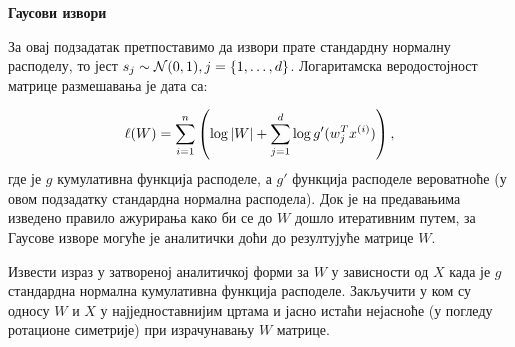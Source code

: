 \item {} \textbf{Гаусови извори}

За овај подзадатак претпоставимо да извори прате стандардну нормалну расподелу, то јест $s_j \sim \mathcal{N}(0,1), j=\{1,\ldots,{d}\}$. Логаритамска веродостојност матрице размешавања је дата са:

$$\ell(W) = \sum_{i=1}^{n}\left(\log|W| + \sum_{j=1}^{d} \log g'(w_j^Tx^{(i)})\right),$$ где је $g$ кумулативна функција расподеле, а $g'$ функција расподеле вероватноће (у овом подзадатку стандардна нормална расподела). Док је на предавањима изведено правило ажурирања како би се до $W$ дошло итеративним путем, за Гаусове изворе могуће је аналитички доћи до резултујуће матрице $W$.

Извести израз у затвореној аналитичкој форми за $W$ у зависности од $X$ када је $g$ стандардна нормална кумулативна функција расподеле. Закључити у ком су односу $W$ и $X$ у најједноставнијим цртама и јасно истаћи нејасноће (у погледу ротационе симетрије) при израчунавању $W$ матрице.

